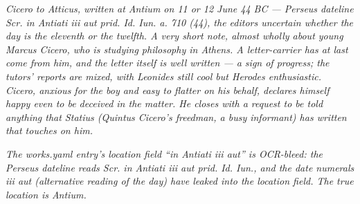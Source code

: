 
\textit{Cicero to Atticus, written at Antium on 11 or 12 June 44
BC --- Perseus dateline \textit{Scr. in Antiati iii aut prid.
Id. Iun. a. 710 (44)}, the editors uncertain whether the day is
the eleventh or the twelfth. A very short note, almost wholly
about young Marcus Cicero, who is studying philosophy in Athens.
A letter-carrier has at last come from him, and the letter
itself is well written --- a sign of progress; the tutors'
reports are mixed, with Leonides still cool but Herodes
enthusiastic. Cicero, anxious for the boy and easy to flatter
on his behalf, declares himself happy even to be deceived in
the matter. He closes with a request to be told anything that
Statius (Quintus Cicero's freedman, a busy informant) has
written that touches on him.}

\textit{The works.yaml entry's location field ``in Antiati iii
aut'' is OCR-bleed: the Perseus dateline reads \textit{Scr. in
Antiati iii aut prid. Id. Iun.}, and the date numerals
\textit{iii aut} (alternative reading of the day) have leaked
into the location field. The true location is Antium.}
